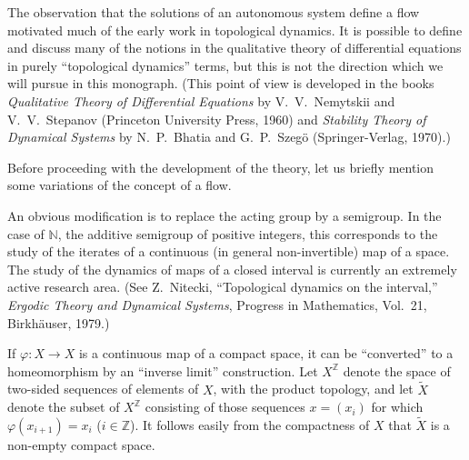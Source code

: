 The observation that the solutions of an autonomous system define a flow motivated much of the early work in topological dynamics. It is possible to define and discuss many of the notions in the qualitative theory of differential equations in purely ``topological dynamics'' terms, but this is not the direction which we will pursue in this monograph. (This point of view is developed in the books \emph{Qualitative Theory of Differential Equations} by V.~V.~Nemytskii and V.~V.~Stepanov (Princeton University Press, 1960) and \emph{Stability Theory of Dynamical Systems} by N.~P.~Bhatia and G.~P.~Szegö (Springer-Verlag, 1970).)

Before proceeding with the development of the theory, let us briefly mention some variations of the concept of a flow.

An obvious modification is to replace the acting group by a semigroup. In the case of $\mathbb{N}$, the additive semigroup of positive integers, this corresponds to the study of the iterates of a continuous (in general non-invertible) map of a space. The study of the dynamics of maps of a closed interval is currently an extremely active research area. (See Z.~Nitecki, ``Topological dynamics on the interval,'' \emph{Ergodic Theory and Dynamical Systems}, Progress in Mathematics, Vol.~21, Birkhäuser, 1979.)

If $\varphi : X \to X$ is a continuous map of a compact space, it can be ``converted'' to a homeomorphism by an ``inverse limit'' construction. Let $X^{\mathbb{Z}}$ denote the space of two-sided sequences of elements of $X$, with the product topology, and let $\tilde{X}$ denote the subset of $X^{\mathbb{Z}}$ consisting of those sequences $x = (x_{i})$ for which $\varphi(x_{i+1}) = x_{i}$ ($i \in \mathbb{Z}$). It follows easily from the compactness of $X$ that $\tilde{X}$ is a non-empty compact space.

